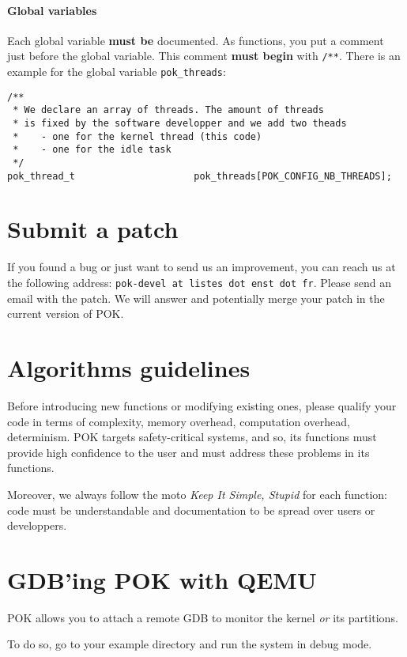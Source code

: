 \documentclass[oneside]{article}
\begin{document}
      \paragraph{Global variables\\}
      Each global variable \textbf{must be} documented. As functions, you put a
      comment just before the global variable. This comment \textbf{must begin}
      with \texttt{/**}. There is an example for the global variable
      \texttt{pok\_threads}:
      \begin{verbatim}
/**
 * We declare an array of threads. The amount of threads
 * is fixed by the software developper and we add two theads
 *    - one for the kernel thread (this code)
 *    - one for the idle task
 */
pok_thread_t                     pok_threads[POK_CONFIG_NB_THREADS];
      \end{verbatim}


\section{Submit a patch}
If you found a bug or just want to send us an improvement, you can reach us at
the following address: \texttt{pok-devel at listes dot enst dot fr}. Please send
an email with the patch. We will answer and potentially merge your patch in the
current version of POK.

\section{Algorithms guidelines}
Before introducing new functions or modifying existing ones, please qualify your
code in terms of complexity, memory overhead, computation overhead, determinism.
POK targets safety-critical systems, and so, its functions must provide high
confidence to the user and must address these problems in its functions.

Moreover, we always follow the moto \textit{Keep It Simple, Stupid} for each
function: code must be understandable and documentation to be spread over users
or developpers.

\section{GDB'ing POK with QEMU}
POK allows you to attach a remote GDB to monitor the kernel \textit{or} its
partitions.

To do so, go to your example directory and run the system in debug mode.
\end{document}
